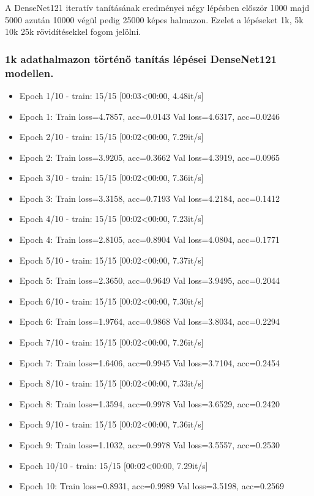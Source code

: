 A DenseNet121 iteratív tanításának eredményei négy lépésben először 1000 majd 5000 azután 10000 végül pedig 25000 képes halmazon. Ezelet a lépéseket 1k, 5k 10k 25k rövidítésekkel fogom jelölni.

\subsubsection{1k adathalmazon történő tanítás lépései DenseNet121 modellen.}
  \begin{itemize} 
    \item Epoch 1/10 - train: 15/15 [00:03<00:00,  4.48it/s]
    \item Epoch 1: Train loss=4.7857, acc=0.0143 Val loss=4.6317, acc=0.0246
    \item Epoch 2/10 - train: 15/15 [00:02<00:00,  7.29it/s]
    \item Epoch 2: Train loss=3.9205, acc=0.3662 Val loss=4.3919, acc=0.0965
    \item Epoch 3/10 - train: 15/15 [00:02<00:00,  7.36it/s]
    \item Epoch 3: Train loss=3.3158, acc=0.7193 Val loss=4.2184, acc=0.1412
    \item Epoch 4/10 - train: 15/15 [00:02<00:00,  7.23it/s]
    \item Epoch 4: Train loss=2.8105, acc=0.8904 Val loss=4.0804, acc=0.1771
    \item Epoch 5/10 - train: 15/15 [00:02<00:00,  7.37it/s]
    \item Epoch 5: Train loss=2.3650, acc=0.9649 Val loss=3.9495, acc=0.2044
    \item Epoch 6/10 - train: 15/15 [00:02<00:00,  7.30it/s]
    \item Epoch 6: Train loss=1.9764, acc=0.9868 Val loss=3.8034, acc=0.2294
    \item Epoch 7/10 - train: 15/15 [00:02<00:00,  7.26it/s]
    \item Epoch 7: Train loss=1.6406, acc=0.9945 Val loss=3.7104, acc=0.2454
    \item Epoch 8/10 - train: 15/15 [00:02<00:00,  7.33it/s]
    \item Epoch 8: Train loss=1.3594, acc=0.9978 Val loss=3.6529, acc=0.2420
    \item Epoch 9/10 - train: 15/15 [00:02<00:00,  7.36it/s]
    \item Epoch 9: Train loss=1.1032, acc=0.9978 Val loss=3.5557, acc=0.2530
    \item Epoch 10/10 - train: 15/15 [00:02<00:00,  7.29it/s]
    \item Epoch 10: Train loss=0.8931, acc=0.9989 Val loss=3.5198, acc=0.2569
  \end{itemize}

